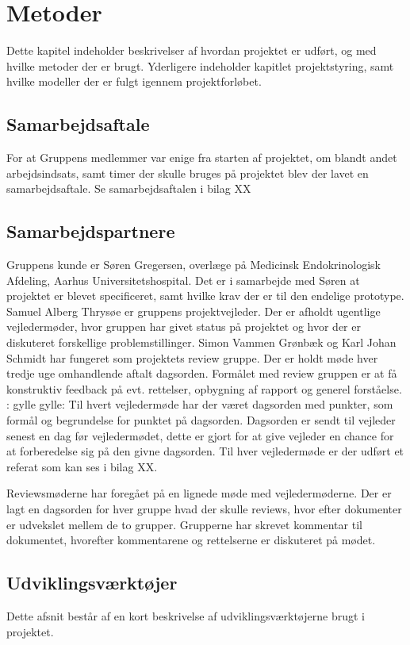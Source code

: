 \chapter{Metoder}
Dette kapitel indeholder beskrivelser af hvordan projektet er udført, og med hvilke metoder der er brugt. Yderligere indeholder kapitlet projektstyring, samt hvilke modeller der er fulgt igennem projektforløbet. 

\section{Samarbejdsaftale}
For at Gruppens medlemmer var enige fra starten af projektet, om blandt andet arbejdsindsats, samt timer der skulle bruges på projektet blev der lavet en samarbejdsaftale. Se samarbejdsaftalen i bilag XX

\section{Samarbejdspartnere}
Gruppens kunde er Søren Gregersen, overlæge på Medicinsk Endokrinologisk Afdeling, Aarhus Universitetshospital. Det er i samarbejde med Søren at projektet er blevet specificeret, samt hvilke krav der er til den endelige prototype.
Samuel Alberg Thrysøe er gruppens projektvejleder. Der er afholdt ugentlige vejledermøder, hvor gruppen har givet status på projektet og hvor der er diskuteret forskellige problemstillinger. 
Simon Vammen Grønbæk og Karl Johan Schmidt har fungeret som projektets review gruppe. Der er holdt møde hver tredje uge omhandlende aftalt dagsorden. Formålet med review gruppen er at få konstruktiv feedback på evt. rettelser, opbygning af rapport og generel forståelse. : gylle gylle: Til hvert vejledermøde har der været dagsorden med punkter, som formål og begrundelse for punktet på dagsorden. Dagsorden er sendt til vejleder senest en dag før vejledermødet, dette er gjort for at give vejleder en chance for at forberedelse sig på den givne dagsorden. Til hver vejledermøde er der udført et referat som kan ses i bilag XX. 

Reviewsmøderne har foregået på en lignede møde med vejledermøderne. Der er lagt en dagsorden for hver gruppe hvad der skulle reviews, hvor efter dokumenter er udvekslet mellem de to grupper. Grupperne har skrevet kommentar til dokumentet, hvorefter kommentarene og rettelserne er diskuteret på mødet. 

\newpage
\section{Udviklingsværktøjer}
Dette afsnit består af en kort beskrivelse af udviklingsværktøjerne brugt i projektet.

